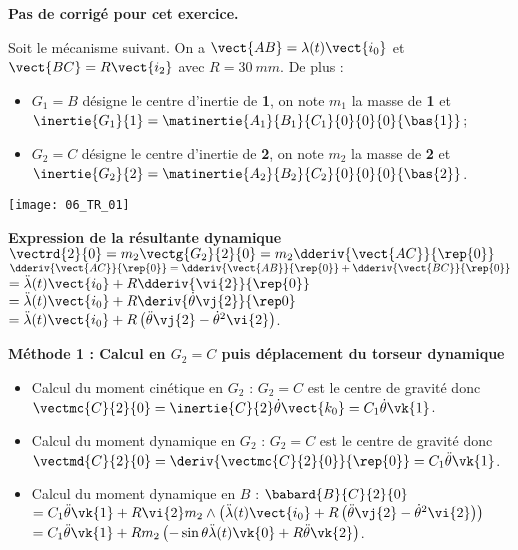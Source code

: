 \normaltrue
\correctiontrue


\setcounter{numques}{0}
\ifcorrection
\else
\textbf{Pas de corrigé pour cet exercice.}
\fi

\ifprof
\else
Soit le mécanisme suivant. On a $\vect{AB}=\lambda(t)\vect{i_0}$ et $\vect{BC}=R\vect{i_2}$ avec $R=\SI{30}{mm}$.
De plus :
\begin{itemize}
\item $G_1=B$ désigne le centre d'inertie de \textbf{1}, on note $m_1$ la masse de \textbf{1} et $\inertie{G_1}{1}=\matinertie{A_1}{B_1}{C_1}{0}{0}{0}{\bas{1}}$; 
\item $G_2=C$ désigne le centre d'inertie de \textbf{2}, on note $m_2$ la masse de \textbf{2} et $\inertie{G_2}{2}=\matinertie{A_2}{B_2}{C_2}{0}{0}{0}{\bas{2}}$.
\end{itemize}
\begin{center}
\texttt{[image: 06\_TR\_01]}
\end{center}
\fi

\ifprof

\textbf{Expression de la résultante dynamique}
$\vectrd{2}{0}=m_2\vectg{G_2}{2}{0} = m_2\dderiv{\vect{AC}}{\rep{0}}$
$\dderiv{\vect{AC}}{\rep{0}}= \dderiv{\vect{AB}}{\rep{0}}+\dderiv{\vect{BC}}{\rep{0}}$
$= \ddot{\lambda}(t) \vect{i_0} + R \dderiv{\vi{2}}{\rep{0}}$
$= \ddot{\lambda}(t) \vect{i_0} + R \deriv{\dot{\theta} \vj{2}}{\rep0}$
$= \ddot{\lambda}(t) \vect{i_0} + R \left(\ddot{\theta} \vj{2} - \dot{\theta}^2 \vi{2}\right) $.



\textbf{Méthode 1 : Calcul en $G_2=C$ puis déplacement du torseur dynamique}
\begin{itemize}
\item Calcul du moment cinétique en $G_2$ : $G_2=C$ est le centre de gravité donc $\vectmc{C}{2}{0}=\inertie{C}{2}\dot{\theta}\vect{k_0} = C_1  \dot{\theta} \vk{1}$.
\item Calcul du moment dynamique en $G_2$ : $G_2=C$ est le centre de gravité donc $\vectmd{C}{2}{0}=\deriv{\vectmc{C}{2}{0}}{\rep{0}}= C_1  \ddot{\theta} \vk{1}$.
\item Calcul du moment dynamique en $B$ : $\babard{B}{C}{2}{0} $
$= C_1  \ddot{\theta} \vk{1} + R\vi{2}m_2\wedge\left(  \ddot{\lambda}(t) \vect{i_0} + R \left(\ddot{\theta} \vj{2} - \dot{\theta}^2 \vi{2}\right)\right)$
$= C_1  \ddot{\theta} \vk{1} + Rm_2\left( -\sin \theta \ddot{\lambda}(t) \vk{0} + R \ddot{\theta} \vk{2}\right)$.
\end{itemize}

